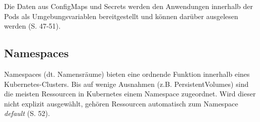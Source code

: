 \documentclass[11pt,a4paper]{article}
\begin{document}
% 

Die Daten aus ConfigMaps und Secrets werden den Anwendungen innerhalb der Pods als Umgebungsvariablen
bereitgestellt und können darüber ausgelesen werden \cite{Schmeling_Dargatz_2022} (S. 47-51).

\subsection{Namespaces}
Namespaces (dt. Namensräume) bieten eine ordnende Funktion innerhalb eines Kubernetes-Clusters.
Bis auf wenige Ausnahmen (z.B. PersistentVolumes) sind die meisten Ressourcen in Kubernetes einem
Namespace zugeordnet. Wird dieser nicht explizit ausgewählt, gehören Ressourcen automatisch zum
Namespace \emph{default} \cite{Schmeling_Dargatz_2022} (S. 52).
\end{document}
